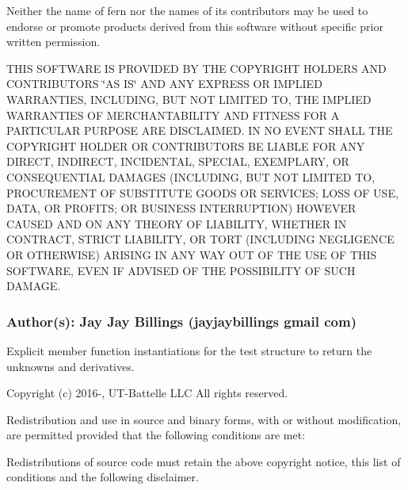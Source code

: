 Neither the name of fern nor the names of its contributors may be used to endorse or promote products derived from this software without specific prior written permission.

T\+H\+IS S\+O\+F\+T\+W\+A\+RE IS P\+R\+O\+V\+I\+D\+ED BY T\+HE C\+O\+P\+Y\+R\+I\+G\+HT H\+O\+L\+D\+E\+RS A\+ND C\+O\+N\+T\+R\+I\+B\+U\+T\+O\+RS \char`\"{}\+A\+S I\+S\char`\"{} A\+ND A\+NY E\+X\+P\+R\+E\+SS OR I\+M\+P\+L\+I\+ED W\+A\+R\+R\+A\+N\+T\+I\+ES, I\+N\+C\+L\+U\+D\+I\+NG, B\+UT N\+OT L\+I\+M\+I\+T\+ED TO, T\+HE I\+M\+P\+L\+I\+ED W\+A\+R\+R\+A\+N\+T\+I\+ES OF M\+E\+R\+C\+H\+A\+N\+T\+A\+B\+I\+L\+I\+TY A\+ND F\+I\+T\+N\+E\+SS F\+OR A P\+A\+R\+T\+I\+C\+U\+L\+AR P\+U\+R\+P\+O\+SE A\+RE D\+I\+S\+C\+L\+A\+I\+M\+ED. IN NO E\+V\+E\+NT S\+H\+A\+LL T\+HE C\+O\+P\+Y\+R\+I\+G\+HT H\+O\+L\+D\+ER OR C\+O\+N\+T\+R\+I\+B\+U\+T\+O\+RS BE L\+I\+A\+B\+LE F\+OR A\+NY D\+I\+R\+E\+CT, I\+N\+D\+I\+R\+E\+CT, I\+N\+C\+I\+D\+E\+N\+T\+AL, S\+P\+E\+C\+I\+AL, E\+X\+E\+M\+P\+L\+A\+RY, OR C\+O\+N\+S\+E\+Q\+U\+E\+N\+T\+I\+AL D\+A\+M\+A\+G\+ES (I\+N\+C\+L\+U\+D\+I\+NG, B\+UT N\+OT L\+I\+M\+I\+T\+ED TO, P\+R\+O\+C\+U\+R\+E\+M\+E\+NT OF S\+U\+B\+S\+T\+I\+T\+U\+TE G\+O\+O\+DS OR S\+E\+R\+V\+I\+C\+ES; L\+O\+SS OF U\+SE, D\+A\+TA, OR P\+R\+O\+F\+I\+TS; OR B\+U\+S\+I\+N\+E\+SS I\+N\+T\+E\+R\+R\+U\+P\+T\+I\+ON) H\+O\+W\+E\+V\+ER C\+A\+U\+S\+ED A\+ND ON A\+NY T\+H\+E\+O\+RY OF L\+I\+A\+B\+I\+L\+I\+TY, W\+H\+E\+T\+H\+ER IN C\+O\+N\+T\+R\+A\+CT, S\+T\+R\+I\+CT L\+I\+A\+B\+I\+L\+I\+TY, OR T\+O\+RT (I\+N\+C\+L\+U\+D\+I\+NG N\+E\+G\+L\+I\+G\+E\+N\+CE OR O\+T\+H\+E\+R\+W\+I\+SE) A\+R\+I\+S\+I\+NG IN A\+NY W\+AY O\+UT OF T\+HE U\+SE OF T\+H\+IS S\+O\+F\+T\+W\+A\+RE, E\+V\+EN IF A\+D\+V\+I\+S\+ED OF T\+HE P\+O\+S\+S\+I\+B\+I\+L\+I\+TY OF S\+U\+CH D\+A\+M\+A\+GE.

\subsubsection*{Author(s)\+: Jay Jay Billings (jayjaybillings  gmail  com) }

Explicit member function instantiations for the test structure to return the unknowns and derivatives.



 Copyright (c) 2016-\/, U\+T-\/\+Battelle L\+LC All rights reserved.

Redistribution and use in source and binary forms, with or without modification, are permitted provided that the following conditions are met\+:

Redistributions of source code must retain the above copyright notice, this list of conditions and the following disclaimer.

